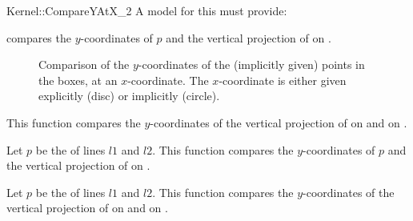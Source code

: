 \begin{ccRefFunctionObjectConcept}{Kernel::CompareYAtX_2}
A model for this must provide:


        {compares the $y$-coordinates of $p$ and the vertical projection
         of  on %
         .}

\begin{ccTexOnly}
\begin{figure}[h]
\centerline{}
\caption{Comparison of the $y$-coordinates of the (implicitly given)
         points in the boxes, at an $x$-coordinate. The $x$-coordinate
         is either given explicitly (disc) or implicitly (circle).
         \label{fig-compare22}}
\end{figure} 
\end{ccTexOnly} 


{This function compares the $y$-coordinates of the vertical projection 
 of  on  and on %
 .}

      {Let $p$ be the  of lines $l1$ and $l2$.
       This function compares the $y$-coordinates of $p$ and 
       the vertical projection of  on %
       .}



{Let $p$ be the  of lines $l1$ and $l2$. This function 
 compares the $y$-coordinates of the vertical projection of  on 
  and on %
 .}


\end{ccRefFunctionObjectConcept}
